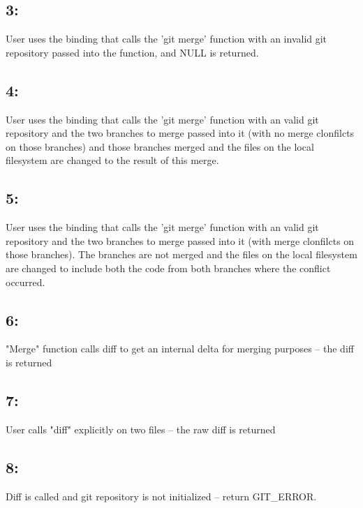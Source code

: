 \documentclass[a4paper]{article}
\begin{document}
\subsection*{3:}
User uses the binding that calls the 'git merge' function with an invalid git repository passed into the function, and NULL is returned.

\subsection*{4:} User uses the binding that calls the 'git merge' function with an valid git repository and the two branches to merge passed into it (with no merge clonfilcts on those branches) and those branches merged and the files on the local filesystem are changed to the result of this merge.

\subsection*{5:} User uses the binding that calls the 'git merge' function with an valid git repository and the two branches to merge passed into it (with merge clonfilcts on those branches). The branches are not merged and the files on the local filesystem are changed to include both the code from both branches where the conflict occurred.

\subsection*{6:}  "Merge" function calls diff to get an internal delta for merging purposes -- the diff is returned
\subsection*{7:}  User calls "diff" explicitly on two files -- the raw diff is returned

\subsection*{8:} Diff is called and git repository is not initialized -- return GIT\_ERROR.
\end{document}
